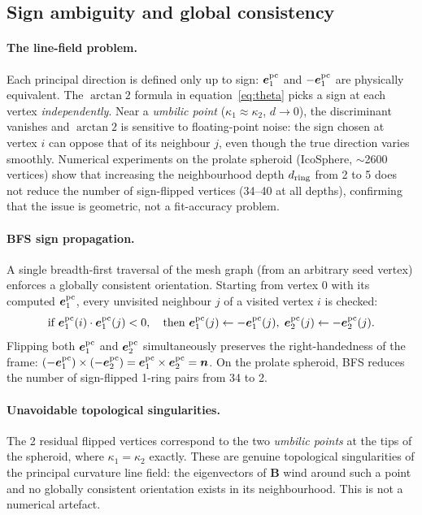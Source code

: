\documentclass[11pt]{article}
\newcommand{\vv}[1]{\bm{#1}}          %
\newcommand{\nn}{\vv{n}}               %
\newcommand{\kone}{\kappa_1}
\newcommand{\ktwo}{\kappa_2}
\begin{document}
\subsection{Sign ambiguity and global consistency}
\label{sec:sign}

\paragraph{The line-field problem.}
Each principal direction is defined only up to sign: $\vv{e}_1^{\rm pc}$ and
$-\vv{e}_1^{\rm pc}$ are physically equivalent.  The $\arctan2$ formula in
equation~\eqref{eq:theta} picks a sign at each vertex \emph{independently}.
Near a \emph{umbilic point} ($\kone\approx\ktwo$, $d\to0$), the discriminant
vanishes and $\arctan2$ is sensitive to floating-point noise: the sign chosen
at vertex $i$ can oppose that of its neighbour $j$, even though the true
direction varies smoothly.  Numerical experiments on the prolate spheroid
(IcoSphere, $\sim$2600 vertices) show that increasing the neighbourhood depth
$d_{\rm ring}$ from 2 to 5 does not reduce the number of sign-flipped vertices
(34--40 at all depths), confirming that the issue is geometric, not a
fit-accuracy problem.

\paragraph{BFS sign propagation.}
A single breadth-first traversal of the mesh graph (from an arbitrary seed
vertex) enforces a globally consistent orientation.  Starting from vertex 0
with its computed $\vv{e}_1^{\rm pc}$, every unvisited neighbour $j$ of a
visited vertex $i$ is checked:
\begin{equation}
  \text{if } \vv{e}_1^{\rm pc}(i)\cdot\vv{e}_1^{\rm pc}(j) < 0,\quad
  \text{then } \vv{e}_1^{\rm pc}(j)\leftarrow -\vv{e}_1^{\rm pc}(j),\;
               \vv{e}_2^{\rm pc}(j)\leftarrow -\vv{e}_2^{\rm pc}(j).
  \label{eq:bfs}
\end{equation}
Flipping both $\vv{e}_1^{\rm pc}$ and $\vv{e}_2^{\rm pc}$ simultaneously
preserves the right-handedness of the frame:
$(-\vv{e}_1^{\rm pc})\times(-\vv{e}_2^{\rm pc})=\vv{e}_1^{\rm pc}\times\vv{e}_2^{\rm pc}=\nn$.
On the prolate spheroid, BFS reduces the number of sign-flipped 1-ring pairs
from 34 to 2.

\paragraph{Unavoidable topological singularities.}
The 2 residual flipped vertices correspond to the two \emph{umbilic points} at
the tips of the spheroid, where $\kone=\ktwo$ exactly.  These are genuine
topological singularities of the principal curvature line field: the
eigenvectors of $\mathbf{B}$ wind around such a point and no globally
consistent orientation exists in its neighbourhood.  This is not a numerical
artefact.
\end{document}
